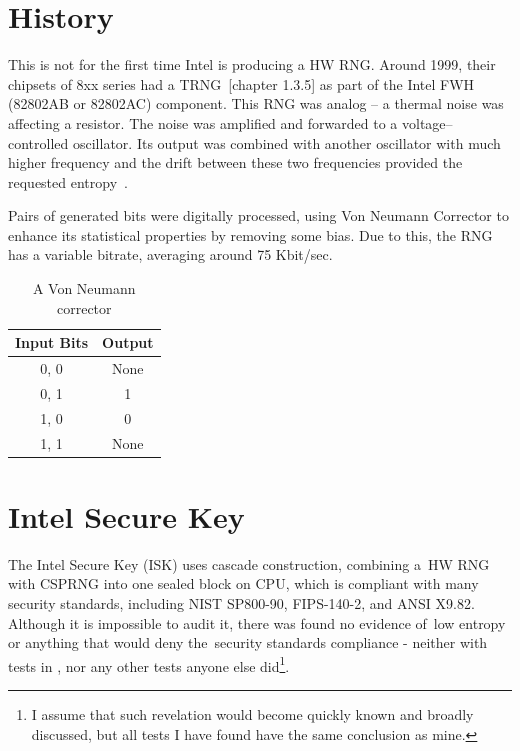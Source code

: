 \section{History}\label{sec:intel-history}
\par{
This is not for the first time Intel is producing a HW RNG. Around 1999, 
their chipsets of 8xx series had a TRNG~\cite{Intel810Manual}[chapter 1.3.5]\cite{RNGTools} 
as part of the Intel FWH (82802AB or 82802AC) component.
This RNG was analog -- a thermal noise was affecting a resistor. 
The noise was amplified and forwarded to a voltage--controlled oscillator. 
Its output was combined with another oscillator with much higher frequency 
and the drift between these two frequencies provided the requested entropy~\cite{IntelRNGAnalysis}.
}
\par{
Pairs of generated bits were digitally processed, using Von Neumann Corrector to enhance its statistical properties by removing some bias. Due to this, the RNG has a variable bitrate, averaging around 75 Kbit/sec.
}
\begin{table}[h!]
  \begin{center}
    \begin{tabular}{|c|c|}
      \hline
      Input Bits &  Output\\
      \hline  
      0, 0 & None\\
      0, 1 & 1\\
      1, 0 & 0\\
      1, 1 & None\\
      \hline
    \end{tabular}    \caption{A Von Neumann corrector}
    \label{fig:VonNeumannCorrector}
  \end{center}
\end{table}
\section{Intel Secure Key}\label{sec:intel-secure-key}
\par{
The Intel Secure Key (ISK) uses cascade construction, combining a~HW RNG
 with CSPRNG into one sealed block on CPU, which is compliant with many 
 security standards, including NIST SP800-90, FIPS-140-2, and ANSI 
X9.82\cite{IntelDRNGGuide}. Although it is impossible to audit it, there was found 
 no evidence of~low entropy or anything that would deny the~security standards 
 compliance - neither with tests in , nor any other 
 tests anyone else did\footnote{I assume that such revelation would become 
 quickly known and broadly discussed, but all tests I have found have 
 the same conclusion as mine.}.
 }

